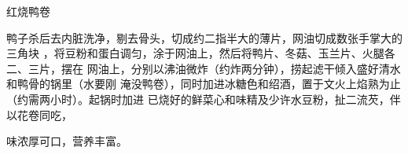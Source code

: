 \begin{recipe}{红烧鸭卷}

\ingredients


\cooking

鸭子杀后去内脏洗净，剔去骨头，切成约二指半大的薄片，网油切成数张手掌大的三角块
，将豆粉和蛋白调匀，涂于网油上，然后将鸭片、冬菇、玉兰片、火腿各二、三片，摆在
网油上，分别以沸油微炸（约炸两分钟），捞起滤干倾入盛好清水和鸭骨的锅里（水要刚
淹没鸭卷），同时加进冰糖色和绍酒，置于文火上焰熟为止（约需两小时）。起锅时加进
已烧好的鲜菜心和味精及少许水豆粉，扯二流芡，伴以花卷同吃，

\notes

味浓厚可口，营养丰富。

\end{recipe}


